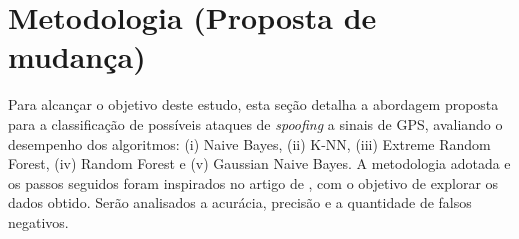 \documentclass[12pt]{article}
\begin{document}
\section{Metodologia (Proposta de mudança)}

Para alcançar o objetivo deste estudo, esta seção detalha a abordagem proposta para a classificação de possíveis ataques de \textit{spoofing} a sinais de GPS, avaliando o desempenho dos algoritmos: (i) Naive Bayes, (ii) K-NN, (iii) Extreme Random Forest, (iv) Random Forest e (v)  Gaussian Naive Bayes. 
A metodologia adotada e os passos seguidos foram inspirados no artigo de \cite{Aissou2021}, com o objetivo de explorar os dados obtido. Serão analisados a acurácia, precisão e a quantidade de falsos negativos.



\end{document}
